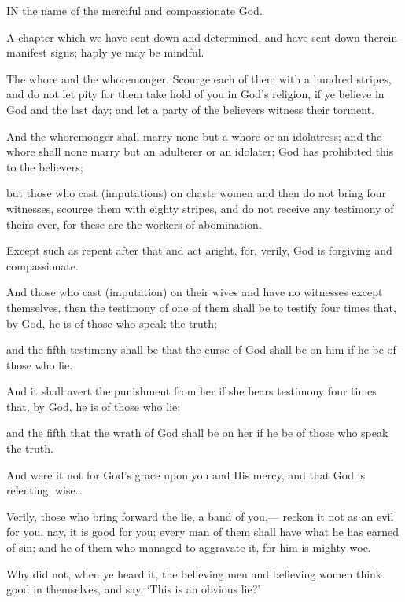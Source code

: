 \documentclass[fontsize=14pt, letterpaper, notitlepage, openany, DIV=12]{scrbook} %
\begin{document}
IN the name of the merciful and compassionate God.

\noindent[24:1]
A chapter which we have sent down and determined, and have sent down therein
manifest signs; haply ye may be mindful.

\noindent[24:2]
The whore and the whoremonger. Scourge each of them with a hundred stripes, and do
not let pity for them take hold of you in God's religion, if ye believe in God and the last day; and
let a party of the believers witness their torment.

\noindent[24:3]
And the whoremonger shall marry none but a whore or an idolatress; and the whore shall
none marry but an adulterer or an idolater; God has prohibited this to the believers;

\noindent[24:4]
but those who cast (imputations) on chaste women and then do not bring four witnesses,
scourge them with eighty stripes, and do not receive any testimony of theirs ever, for these are
the workers of abomination.

\noindent[24:5]
Except such as repent after that and act aright, for, verily, God is forgiving and
compassionate.

\noindent[24:6]
And those who cast (imputation) on their wives and have no witnesses except themselves,
then the testimony of one of them shall be to testify four times that, by God, he is of those who
speak the truth;

\noindent[24:7]
and the fifth testimony shall be that the curse of God shall be on him if he be of those
who lie.

\noindent[24:8]
And it shall avert the punishment from her if she bears testimony four times that, by God,
he is of those who lie;

\noindent[24:9]
and the fifth that the wrath of God shall be on her if he be of those who speak the truth.

\noindent[24:10]
And were it not for God's grace upon you and His mercy, and that God is relenting, wise\ldots %

\noindent[24:11]
Verily, those who bring forward the lie, a band of you,--- reckon it not as an evil for you,
nay, it is good for you; every man of them shall have what he has earned of sin; and he of them
who managed to aggravate it, for him is mighty woe.

\noindent[24:12]
Why did not, when ye heard it, the believing men and believing women think good in
themselves, and say, `This is an obvious lie?'
\end{document}
